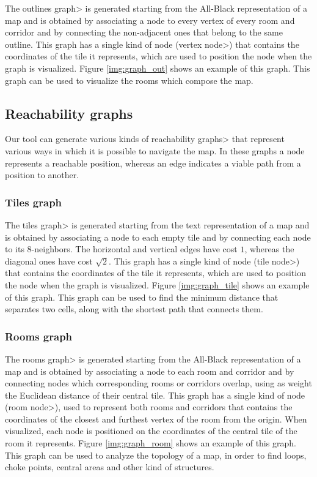 The \<outlines graph> is generated starting from the All-Black representation of a map and is obtained by associating a node to every vertex of every room and corridor and by connecting the non-adjacent ones that belong to the same outline. This graph has a single kind of node (\<vertex node>) that contains the coordinates of the tile it represents, which are used to position the node when the graph is visualized. Figure \ref{img:graph_out} shows an example of this graph. This graph can be used to visualize the rooms which compose the map.

\subsection{Reachability graphs}

Our tool can generate various kinds of \<reachability graphs> that represent various ways in which it is possible to navigate the map. In these graphs a node represents a reachable position, whereas an edge indicates a viable path from a position to another.

\subsubsection{Tiles graph}

The \<tiles graph> is generated starting from the text representation of a map and is obtained by associating a node to each empty tile and by connecting each node to its 8-neighbors. The horizontal and vertical edges have cost $1$, whereas the diagonal ones have cost $\sqrt{2}$. This graph has a single kind of node (\<tile node>) that contains the coordinates of the tile it represents, which are used to position the node when the graph is visualized. Figure \ref{img:graph_tile} shows an example of this graph. This graph can be used to find the minimum distance that separates two cells, along with the shortest path that connects them.

\subsubsection{Rooms graph}

The \<rooms graph> is generated starting from the All-Black representation of a map and is obtained by associating a node to each room and corridor and by connecting nodes which corresponding rooms or corridors overlap, using as weight the Euclidean distance of their central tile. This graph has a single kind of node (\<room node>), used to represent both rooms and corridors that contains the coordinates of the closest and furthest vertex of the room from the origin. When visualized, each node is positioned on the coordinates of the central tile of the room it represents. Figure \ref{img:graph_room} shows an example of this graph. This graph can be used to analyze the topology of a map, in order to find loops, choke points, central areas and other kind of structures.

